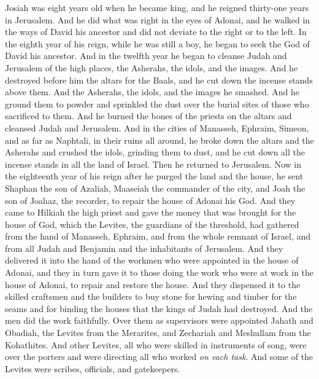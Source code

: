 \begin{biblechapter} %
 Josiah was eight years old when he became king, and he reigned thirty-one years in Jerusalem.
\verse And he did what was right in the eyes of Adonai, and he walked in the ways of David his ancestor and did not deviate to the right or to the left.
\verse In the eighth year of his reign, while he was still a boy, he began to seek the God of David his ancestor. And in the twelfth year he began to cleanse Judah and Jerusalem of the high places, the Asherahs, the idols, and the images.
\verse And he destroyed before him the altars for the Baals, and he cut down the incense stands above them. And the Asherahs, the idols, and the images he smashed. And he ground them to powder and sprinkled the dust over the burial sites of those who sacrificed to them.
\verse And he burned the bones of the priests on the altars and cleansed Judah and Jerusalem.
\verse And in the cities of Manasseh, Ephraim, Simeon, and as far as Naphtali, in their ruins all around,
\verse he broke down the altars and the Asherahs and crushed the idols, grinding them to dust, and he cut down all the incense stands in all the land of Israel. Then he returned to Jerusalem.
 Now in the eighteenth year of his reign after he purged the land and the house, he sent Shaphan the son of Azaliah, Maaseiah the commander of the city, and Joah the son of Joahaz, the recorder, to repair the house of Adonai his God.
\verse And they came to Hilkiah the high priest and gave the money that was brought for the house of God, which the Levites, the guardians of the threshold, had gathered from the hand of Manasseh, Ephraim, and from the whole remnant of Israel, and from all Judah and Benjamin and the inhabitants of Jerusalem.
\verse And they delivered it into the hand of the workmen who were appointed in the house of Adonai, and they in turn gave it to those doing the work who were at work in the house of Adonai, to repair and restore the house.
\verse And they dispensed it to the skilled craftsmen and the builders to buy stone for hewing and timber for the seams and for binding the houses that the kings of Judah had destroyed.
\verse And the men did the work faithfully. Over them as supervisors were appointed Jahath and Obadiah, the Levites from the Merarites, and Zechariah and Meshullam from the Kohathites. And other Levites, all who were skilled in instruments of song,
\verse were over the porters and were directing all who worked \textit{on each task}. And some of the Levites were scribes, officials, and gatekeepers.

\end{biblechapter}
